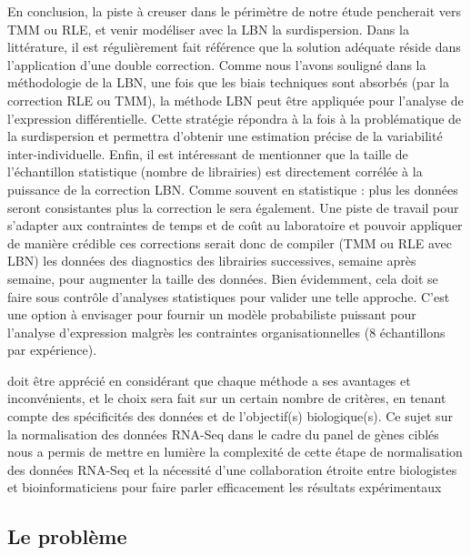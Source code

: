 En conclusion, la piste à creuser dans le périmètre de notre étude pencherait vers TMM ou RLE, et venir modéliser avec la LBN la surdispersion. Dans la littérature, il est régulièrement fait référence que la solution adéquate réside dans l'application d'une double correction\textsuperscript{\cite{robinson_scaling_2010}}. Comme nous l'avons souligné dans la méthodologie de la LBN, une fois que les biais techniques sont absorbés (par la correction RLE ou TMM), la méthode LBN peut être appliquée pour l'analyse de l'expression différentielle. Cette stratégie répondra à la fois à la problématique de la surdispersion et permettra d'obtenir une estimation précise de la variabilité inter-individuelle. Enfin, il est intéressant de mentionner que la taille de l'échantillon statistique (nombre de librairies) est directement corrélée à la puissance de la correction LBN. Comme souvent en statistique : plus les données seront consistantes plus la correction le sera également. Une piste de travail pour s'adapter aux contraintes de temps et de coût au laboratoire et pouvoir appliquer de manière crédible ces corrections serait donc de compiler (TMM ou RLE avec LBN) les données des diagnostics des librairies successives, semaine après semaine, pour augmenter la taille des données.
 Bien évidemment, cela doit se faire sous contrôle d'analyses statistiques pour valider une telle approche. 
C'est une option à envisager pour fournir un modèle probabiliste puissant pour l'analyse d'expression malgrès les contraintes organisationnelles (8 échantillons par expérience).


 doit être apprécié en considérant que chaque méthode a ses avantages et inconvénients, et le choix sera fait sur un certain nombre de critères,
  en tenant compte des spécificités des données et de l'objectif(s) biologique(s). Ce sujet sur la normalisation des données RNA-Seq dans le cadre du panel de gènes ciblés
   nous a permis de mettre en lumière la complexité de cette étape de normalisation des données RNA-Seq et la nécessité d'une collaboration étroite entre biologistes et bioinformaticiens 
   pour faire parler efficacement les résultats expérimentaux 


\subsection{Le problème}

